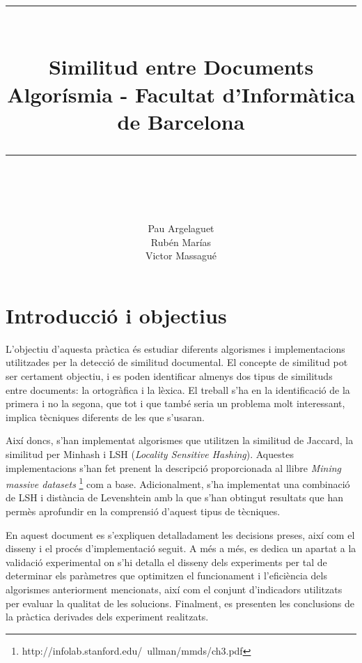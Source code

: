 \documentclass[catalan, 12pt]{report}
\newcommand{\HRule}[1]{\rule{\linewidth}{#1}}
\begin{document}
\date{}
\title{
		\HRule{2pt} \\ [0.5cm]
		\textbf{Similitud entre Documents \\ }
        {Algorísmia - Facultat d'Informàtica de Barcelona}
		\HRule{2pt} \\ [0.5cm]
        \vspace{100px}
		}
\date{}
\author{
		Pau Argelaguet \\ Rubén Marías \\ Victor Massagué  \\
	    }
\date{}
\maketitle
\tableofcontents
\thispagestyle{empty}

\chapter{Introducció  i objectius}

L'objectiu d'aquesta pràctica és estudiar diferents algorismes i implementacions utilitzades per la detecció de similitud documental. El concepte de similitud pot ser certament objectiu, i es poden identificar almenys dos tipus de similituds entre documents: la ortogràfica i la lèxica. El treball s'ha en la identificació de la primera i no la segona, que tot i que també seria un problema molt interessant, implica tècniques diferents de les que s'usaran. \newline

Així doncs, s'han implementat algorismes que utilitzen la similitud de Jaccard, la similitud per Minhash i LSH (\textit{Locality Sensitive Hashing}).  Aquestes implementacions s'han fet prenent la descripció proporcionada al llibre \textit{Mining massive datasets} \footnote{http://infolab.stanford.edu/~ullman/mmds/ch3.pdf} com a base. Adicionalment, s'ha implementat una combinació de LSH i distància de Levenshtein amb la que s'han obtingut resultats que han permès aprofundir en la comprensió d'aquest tipus de tècniques. \newline

En aquest document es s'expliquen detalladament les decisions preses, així com el disseny i el procés d'implementació seguit. A més a més, es dedica un apartat a la validació experimental on s'hi detalla el disseny dels experiments per tal de determinar els paràmetres que optimitzen el funcionament i l'eficiència dels algorismes anteriorment mencionats, així com el conjunt d'indicadors utilitzats per evaluar la qualitat de les solucions. Finalment, es presenten les conclusions de la pràctica derivades dels experiment realitzats.
\end{document}
